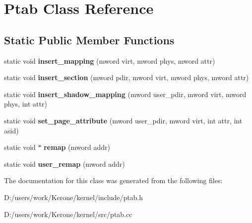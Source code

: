 \section{Ptab Class Reference}
\label{class_ptab}
\subsection*{Static Public Member Functions}
\begin{DoxyCompactItemize}
\item 
\mbox{\label{class_ptab_afc197376e5c5ff0bf1066e64728600f8}} 
static void {\bfseries insert\+\_\+mapping} (mword virt, mword phys, mword attr)
\item 
\mbox{\label{class_ptab_a6f9516c48bdee5e5bbff1ca3fa1644af}} 
static void {\bfseries insert\+\_\+section} (mword pdir, mword virt, mword phys, mword attr)
\item 
\mbox{\label{class_ptab_a836df61bac8385be35424e5a1fa4fb65}} 
static void {\bfseries insert\+\_\+shadow\+\_\+mapping} (mword user\+\_\+pdir, mword virt, mword phys, int attr)
\item 
\mbox{\label{class_ptab_a8b62beadc874c53b73d802598b0c89cf}} 
static void {\bfseries set\+\_\+page\+\_\+attribute} (mword user\+\_\+pdir, mword virt, int attr, int asid)
\item 
\mbox{\label{class_ptab_a267177ee6ceaebee6603f8a552028bbf}} 
static void $\ast$ {\bfseries remap} (mword addr)
\item 
\mbox{\label{class_ptab_afa0c7d10cd15bd26fe92b34a4b57f0bc}} 
static void {\bfseries user\+\_\+remap} (mword addr)
\end{DoxyCompactItemize}


The documentation for this class was generated from the following files\+:\begin{DoxyCompactItemize}
\item 
D\+:/users/work/\+Kerone/kernel/include/ptab.\+h\item 
D\+:/users/work/\+Kerone/kernel/src/ptab.\+cc\end{DoxyCompactItemize}

